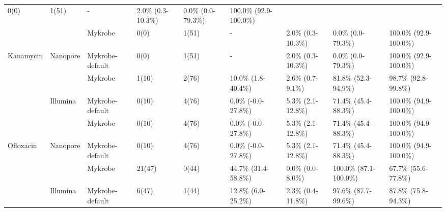 \begin{table}[]
{\begin{tabular}{|l|l|l|l|l|l|l|l|l|}
  \cellcolor[HTML]{EFEFEF}0(0) &
  \cellcolor[HTML]{EFEFEF}1(51) &
  \cellcolor[HTML]{EFEFEF}- &
  \cellcolor[HTML]{EFEFEF}2.0\% (0.3-10.3\%) &
  \cellcolor[HTML]{EFEFEF}0.0\% (0.0-79.3\%) &
  \cellcolor[HTML]{EFEFEF}100.0\% (92.9-100.0\%) \\ \cline{2-9} 
 &
   &
  Mykrobe &
  0(0) &
  1(51) &
  - &
  2.0\% (0.3-10.3\%) &
  0.0\% (0.0-79.3\%) &
  100.0\% (92.9-100.0\%) \\ \cline{3-9} 
\multirow{-4}{*}{Kanamycin} &
  \multirow{-2}{*}{Nanopore} &
  \cellcolor[HTML]{EFEFEF}Mykrobe-default &
  \cellcolor[HTML]{EFEFEF}0(0) &
  \cellcolor[HTML]{EFEFEF}1(51) &
  \cellcolor[HTML]{EFEFEF}- &
  \cellcolor[HTML]{EFEFEF}2.0\% (0.3-10.3\%) &
  \cellcolor[HTML]{EFEFEF}0.0\% (0.0-79.3\%) &
  \cellcolor[HTML]{EFEFEF}100.0\% (92.9-100.0\%) \\ \hline
 &
   &
  Mykrobe &
  1(10) &
  2(76) &
  10.0\% (1.8-40.4\%) &
  2.6\% (0.7-9.1\%) &
  81.8\% (52.3-94.9\%) &
  98.7\% (92.8-99.8\%) \\ \cline{3-9} 
 &
  \multirow{-2}{*}{Illumina} &
  \cellcolor[HTML]{EFEFEF}Mykrobe-default &
  \cellcolor[HTML]{EFEFEF}0(10) &
  \cellcolor[HTML]{EFEFEF}4(76) &
  \cellcolor[HTML]{EFEFEF}0.0\% (-0.0-27.8\%) &
  \cellcolor[HTML]{EFEFEF}5.3\% (2.1-12.8\%) &
  \cellcolor[HTML]{EFEFEF}71.4\% (45.4-88.3\%) &
  \cellcolor[HTML]{EFEFEF}100.0\% (94.9-100.0\%) \\ \cline{2-9} 
 &
   &
  Mykrobe &
  0(10) &
  4(76) &
  0.0\% (-0.0-27.8\%) &
  5.3\% (2.1-12.8\%) &
  71.4\% (45.4-88.3\%) &
  100.0\% (94.9-100.0\%) \\ \cline{3-9} 
\multirow{-4}{*}{Ofloxacin} &
  \multirow{-2}{*}{Nanopore} &
  \cellcolor[HTML]{EFEFEF}Mykrobe-default &
  \cellcolor[HTML]{EFEFEF}0(10) &
  \cellcolor[HTML]{EFEFEF}4(76) &
  \cellcolor[HTML]{EFEFEF}0.0\% (-0.0-27.8\%) &
  \cellcolor[HTML]{EFEFEF}5.3\% (2.1-12.8\%) &
  \cellcolor[HTML]{EFEFEF}71.4\% (45.4-88.3\%) &
  \cellcolor[HTML]{EFEFEF}100.0\% (94.9-100.0\%) \\ \hline
 &
   &
  Mykrobe &
  21(47) &
  0(44) &
  44.7\% (31.4-58.8\%) &
  0.0\% (0.0-8.0\%) &
  100.0\% (87.1-100.0\%) &
  67.7\% (55.6-77.8\%) \\ \cline{3-9} 
 &
  \multirow{-2}{*}{Illumina} &
  \cellcolor[HTML]{EFEFEF}Mykrobe-default &
  \cellcolor[HTML]{EFEFEF}6(47) &
  \cellcolor[HTML]{EFEFEF}1(44) &
  \cellcolor[HTML]{EFEFEF}12.8\% (6.0-25.2\%) &
  \cellcolor[HTML]{EFEFEF}2.3\% (0.4-11.8\%) &
  \cellcolor[HTML]{EFEFEF}97.6\% (87.7-99.6\%) &
  \cellcolor[HTML]{EFEFEF}87.8\% (75.8-94.3\%) \\ \cline{2-9} 

\end{tabular}}
\end{table}
